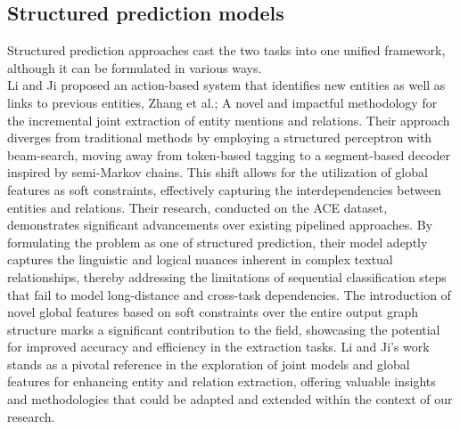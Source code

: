 \subsection{Structured prediction models}
Structured prediction approaches cast the two tasks into one unified framework, although it can be formulated in various ways.\\
Li and Ji\cite{li-ji-2014-incremental} proposed an action-based system that identifies new entities as well as links to previous entities, Zhang et al.\cite{zhang-etal-2017-end};
A novel and impactful methodology for the incremental joint extraction of entity mentions and relations. Their approach diverges from traditional methods by employing a structured perceptron with beam-search, moving away from token-based tagging to a segment-based decoder inspired by semi-Markov chains. This shift allows for the utilization of global features as soft constraints, effectively capturing the interdependencies between entities and relations. Their research, conducted on the ACE dataset, demonstrates significant advancements over existing pipelined approaches. By formulating the problem as one of structured prediction, their model adeptly captures the linguistic and logical nuances inherent in complex textual relationships, thereby addressing the limitations of sequential classification steps that fail to model long-distance and cross-task dependencies. The introduction of novel global features based on soft constraints over the entire output graph structure marks a significant contribution to the field, showcasing the potential for improved accuracy and efficiency in the extraction tasks. Li and Ji's work stands as a pivotal reference in the exploration of joint models and global features for enhancing entity and relation extraction, offering valuable insights and methodologies that could be adapted and extended within the context of our research.\\

